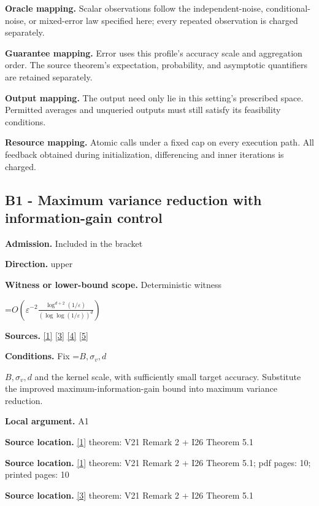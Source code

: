 \documentclass[10pt,a4paper]{article}
\newcommand{\AtlasMath}[1]{\par\begingroup\centering\setbox0=\hbox{$\displaystyle #1$}\ifdim\wd0>1.4\linewidth\typeout{ATLAS WIDE FORMULA: \the\wd0}\fi\ifdim\wd0>\linewidth\resizebox{\linewidth}{!}{\box0}\else\box0\fi\par\endgroup}
\newcommand{\AtlasInlineMath}[1]{\begingroup\setbox0=\hbox{$#1$}\ifdim\wd0>.4\linewidth\endgroup\AtlasMath{#1}\else\endgroup$#1$\fi}
\begin{document}
\textbf{Oracle mapping.} Scalar observations follow the independent-noise, conditional-noise, or mixed-error law specified here; every repeated observation is charged separately.

\textbf{Guarantee mapping.} Error uses this profile's accuracy scale and aggregation order. The source theorem's expectation, probability, and asymptotic quantifiers are retained separately.

\textbf{Output mapping.} The output need only lie in this setting's prescribed space. Permitted averages and unqueried outputs must still satisfy its feasibility conditions.

\textbf{Resource mapping.} Atomic calls under a fixed cap on every execution path. All feedback obtained during initialization, differencing and inner iterations is charged.

\subsection{B1 - Maximum variance reduction with information-gain control}
\textbf{Admission.} Included in the bracket

\textbf{Direction.} upper

\textbf{Witness or lower-bound scope.} Deterministic witness

\AtlasMath{O\!\left(\varepsilon^{-2}\frac{\log^{d+2}(1/\varepsilon)}{(\log\log(1/\varepsilon))^d}\right)}
\textbf{Sources.} \href{https://arxiv.org/html/2602.17940v1}{[1]} \href{https://proceedings.neurips.cc/paper/2021/file/b1300291698eadedb559786c809cc592-Paper.pdf}{[3]} \href{https://arxiv.org/html/2502.06363v1}{[4]} \href{https://arxiv.org/html/2607.29245v2}{[5]}

\textbf{Conditions.} Fix \AtlasInlineMath{B,\sigma_v,d} and the kernel scale, with sufficiently small target accuracy. Substitute the improved maximum-information-gain bound into maximum variance reduction.

\textbf{Local argument.} A1

\textbf{Source location.} \href{https://arxiv.org/html/2602.17940v1}{[1]} theorem: V21 Remark 2 + I26 Theorem 5.1

\textbf{Source location.} \href{https://arxiv.org/html/2602.17940v1}{[1]} theorem: V21 Remark 2 + I26 Theorem 5.1; pdf pages: 10; printed pages: 10

\textbf{Source location.} \href{https://proceedings.neurips.cc/paper/2021/file/b1300291698eadedb559786c809cc592-Paper.pdf}{[3]} theorem: V21 Remark 2 + I26 Theorem 5.1
\end{document}

